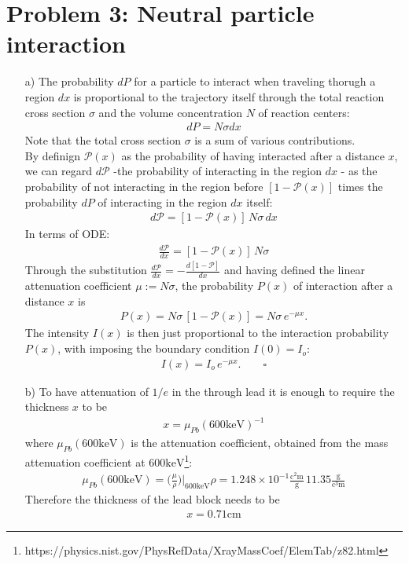 \documentclass[10pt,a4paper]{article}
\begin{document}
\section*{Problem 3: Neutral particle interaction}
\begin{enumerate}
\item[a)] The probability $dP$ for a particle to interact when traveling thorugh a region $dx$ is proportional to the trajectory itself through the total reaction cross section $\sigma$ and the volume concentration $N$ of reaction centers:
\begin{align*}
dP = N\sigma dx
\end{align*}
Note that the total cross section $\sigma$ is a sum of various contributions.\\
By definign $\mathscr{P}(x)$ as the probability of having interacted after a distance $x$, we can regard $d\mathscr{P}$ -the probability of interacting in the region $dx$ - as the probability of not interacting in the region before $[1-\mathscr{P}(x)]$ times the probability $dP$ of interacting in the region $dx$ itself:
\begin{align*}
d\mathscr{P} = [1-\mathscr{P}(x)]\,N\sigma\,dx
\end{align*}
In terms of ODE:
\begin{align*}
\frac{d\mathscr{P}}{dx} = [1-\mathscr{P}(x)]\,N\sigma
\end{align*}
Through the substitution $\frac{d\mathscr{P}}{dx}=-\frac{d[1-\mathscr{P}]}{dx}$ and having defined the linear attenuation coefficient $\mu:=N\sigma$, the probability $P(x)$ of interaction after a distance $x$ is
\begin{align*}
P(x) = N\sigma\,[1-\mathscr{P}(x)] = N\sigma\,e^{-\mu x}.
\end{align*}
The intensity $I(x)$ is then just proportional to the interaction probability $P(x)$, with imposing the boundary condition $I(0)=I_o$:
\begin{align*}
I(x) = I_o\,e^{-\mu x}.\qquad\square
\end{align*}

\item[b)] To have attenuation of $1/e$ in the through lead it is enough to require the thickness $x$ to be
\begin{align*}
x = \mu_{Pb}(600\si{\kilo\electronvolt})^{-1}
\end{align*}
where $\mu_{Pb}(600\si{\kilo\electronvolt})$ is the attenuation coefficient, obtained from the mass attenuation coefficient at $600\si{\kilo\electronvolt}$\footnote{https://physics.nist.gov/PhysRefData/XrayMassCoef/ElemTab/z82.html}:
\begin{align*}
\mu_{Pb}(600\si{\kilo\electronvolt}) = \bigg(\frac{\mu}{\rho}\bigg)\bigg|_{600\si{\kilo\electronvolt}}\rho = 1.248\times10^{-1}\frac{\si{\square\centi\meter}}{\si{\gram}}\,11.35\frac{\si{\gram}}{\si{\cubic\centi\meter}}
\end{align*}
Therefore the thickness of the lead block needs to be
\begin{align*}
x =  0.71\si{\centi\meter}
\end{align*}


\end{enumerate}
\end{document}
